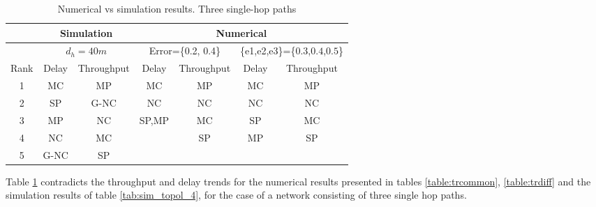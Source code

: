 \documentclass[journal, onecolumn, 12pt]{IEEEtran}
\begin{document}
\begin{table}[h]
\begin{center}
\scriptsize
\begin{tabular}{|c|c|c|c|c|c|c|}
\hline
     & \multicolumn{2}{|c|}{Simulation}     & \multicolumn{4}{|c|}{Numerical}                                   \\ \hline
     & \multicolumn{2}{|c|}{$d_{h}=40m$} & \multicolumn{2}{|c|}{ Error=\{0.2, 0.4\}} & \multicolumn{2}{|c|}{ \{e1,e2,e3\}=\{$0.3$,$0.4$,$0.5$\} }\\ \hline
Rank & Delay               & Throughput              &  Delay           & Throughput  &  Delay           & Throughput          \\ \hline
1    & MC                 & MP                & MC              & MP   &  MC & MP      \\ \hline
2    & SP                 & G-NC                & NC              & NC & NC & NC  \\ \hline
3    & MP                & NC                & SP,MP              & MC &  SP & MC  \\ \hline
4    & NC                 & MC                &               & SP & MP & SP  \\ \hline
5    & G-NC                 & SP                &               &   &  &    \\ \hline
\end{tabular}
\end{center}
\caption{Numerical vs simulation results. Three single-hop paths}
\label{tab:comp_3}
\end{table}

Table \ref{tab:comp_3} contradicts the throughput and delay trends for the numerical results presented in tables \ref{table:trcommon}, \ref{table:trdiff} and the simulation results of table \ref{tab:sim_topol_4},
for the case of a network consisting of three single hop paths.
\end{document}
